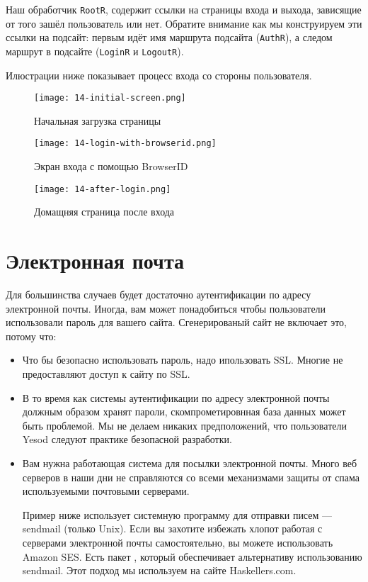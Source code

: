 Наш обработчик \lstinline'RootR', содержит ссылки на страницы входа и выхода, зависящие от того зашёл пользователь или нет. Обратите внимание как мы конструируем эти ссылки на подсайт: первым идёт имя маршрута подсайта (\lstinline'AuthR'), а следом маршрут в подсайте (\lstinline'LoginR' и \lstinline'LogoutR').

Илюстрации ниже показывает процесс входа со стороны пользователя.

\begin{figure}[tbh]
  \centering
  \texttt{[image: 14-initial-screen.png]}
  \caption{Начальная загрузка страницы}
\end{figure}

\begin{figure}[tbh]
  \centering
  \texttt{[image: 14-login-with-browserid.png]}
  \caption{Экран входа с помощью BrowserID}
\end{figure}

\begin{figure}[tbh]
  \centering
  \texttt{[image: 14-after-login.png]}
  \caption{Домащняя страница после входа}
\end{figure}

\section{Электронная почта}

Для большинства случаев будет достаточно аутентификации по адресу электронной почты. Иногда, вам может понадобиться чтобы пользователи использовали пароль для вашего сайта. Сгенерированый сайт не включает это, потому что:

\begin{itemize}
    \item Что бы безопасно использовать пароль, надо ипользовать SSL. Многие не предоставляют доступ к сайту по SSL.

    \item В то время как системы аутентификации по адресу электронной почты должным образом хранят пароли, скомпрометировнная база данных может быть проблемой. Мы не делаем никаких предположений, что пользователи Yesod следуют практике безопасной разработки.

    \item Вам нужна работающая система для посылки электронной почты. Много веб серверов в наши дни не справляются со всеми механизмами защиты от спама используемыми почтовыми серверами.

    \begin{remark}
    Пример ниже использует системную программу для отправки писем --- sendmail (только Unix). Если вы захотите избежать хлопот работая с серверами электронной почты самостоятельно, вы можете использовать Amazon SES. Есть пакет , который обеспечивает альтернативу использованию sendmail. Этот подход мы используем на сайте Haskellers.com.
    \end{remark}
\end{itemize}

